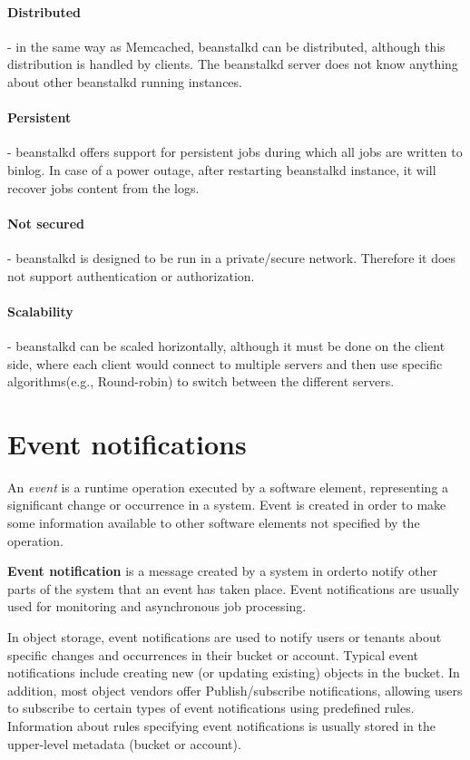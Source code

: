     \paragraph{Distributed}- in the same way as Memcached, beanstalkd can be distributed, although this distribution is handled by clients. The beanstalkd server does not know anything about other beanstalkd running instances.
    \paragraph{Persistent}- beanstalkd offers support for persistent jobs during which all jobs are written to binlog. In case of a power outage, after restarting beanstalkd instance, it will recover jobs content from the logs.
    \paragraph{Not secured}- beanstalkd is designed to be run in a private/secure network. Therefore it does not support authentication or authorization.
    \paragraph{Scalability}- beanstalkd can be scaled horizontally, although it must be done on the client side, where each client would connect to multiple servers and then use specific algorithms(e.g., Round-robin) to switch between the different servers.

\section{Event notifications}
    An \textit{event} is a runtime operation executed by a software element, representing a significant change or occurrence in a system. Event is created in order to make some information available to other software elements not specified by the operation\cite{eventArchitecturalPatterns}.

    \textbf{Event notification} is a message created by a system in orderto notify other parts of the system that an event has taken place\cite{eventRedHatEventDrivenArch}. Event notifications are usually used for monitoring and asynchronous job processing.

    In object storage, event notifications are used to notify users or tenants about specific changes and occurrences in their bucket or account. Typical event notifications include creating new (or updating existing) objects in the bucket. In addition, most object vendors offer Publish/subscribe notifications, allowing users to subscribe to certain types of event notifications using predefined rules. Information about rules specifying event notifications is usually stored in the upper-level metadata (bucket or account).


